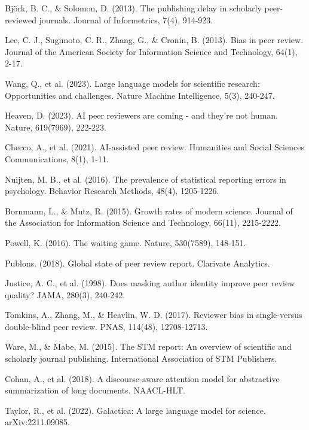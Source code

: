 \documentclass[11pt,a4paper]{article}
\begin{document}
\begin{thebibliography}{99}

 Björk, B. C., \& Solomon, D. (2013). The publishing delay in scholarly peer-reviewed journals. Journal of Informetrics, 7(4), 914-923.

 Lee, C. J., Sugimoto, C. R., Zhang, G., \& Cronin, B. (2013). Bias in peer review. Journal of the American Society for Information Science and Technology, 64(1), 2-17.

 Wang, Q., et al. (2023). Large language models for scientific research: Opportunities and challenges. Nature Machine Intelligence, 5(3), 240-247.

 Heaven, D. (2023). AI peer reviewers are coming - and they're not human. Nature, 619(7969), 222-223.

 Checco, A., et al. (2021). AI-assisted peer review. Humanities and Social Sciences Communications, 8(1), 1-11.

 Nuijten, M. B., et al. (2016). The prevalence of statistical reporting errors in psychology. Behavior Research Methods, 48(4), 1205-1226.

 Bornmann, L., \& Mutz, R. (2015). Growth rates of modern science. Journal of the Association for Information Science and Technology, 66(11), 2215-2222.

 Powell, K. (2016). The waiting game. Nature, 530(7589), 148-151.

 Publons. (2018). Global state of peer review report. Clarivate Analytics.

 Justice, A. C., et al. (1998). Does masking author identity improve peer review quality? JAMA, 280(3), 240-242.

 Tomkins, A., Zhang, M., \& Heavlin, W. D. (2017). Reviewer bias in single-versus double-blind peer review. PNAS, 114(48), 12708-12713.

 Ware, M., \& Mabe, M. (2015). The STM report: An overview of scientific and scholarly journal publishing. International Association of STM Publishers.

 Cohan, A., et al. (2018). A discourse-aware attention model for abstractive summarization of long documents. NAACL-HLT.

 Taylor, R., et al. (2022). Galactica: A large language model for science. arXiv:2211.09085.


\end{thebibliography}
\end{document}
